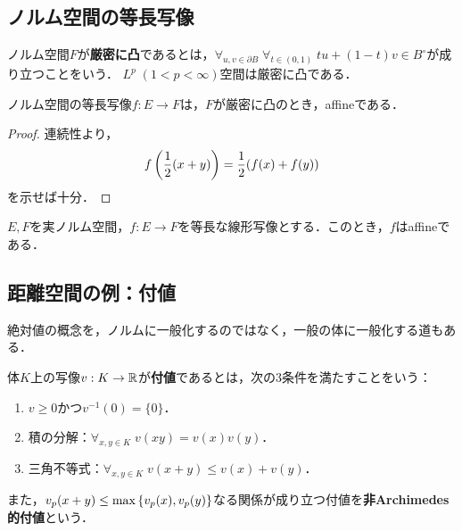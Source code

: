 \documentclass[uplatex,dvipdfmx]{jsreport}
\begin{document}
\subsection{ノルム空間の等長写像}

\begin{definition}
    ノルム空間$F$が\textbf{厳密に凸}であるとは，$\forall_{u,v\in\partial B}\;\forall_{t\in(0,1)}\;tu+(1-t)v\in B^\circ$が成り立つことをいう．
    $L^p\;(1<p<\infty)$空間は厳密に凸である．
\end{definition}

\begin{theorem}
    ノルム空間の等長写像$f:E\to F$は，$F$が厳密に凸のとき，affineである．
\end{theorem}
\begin{proof}
    連続性より，
    \[f\left(\frac{1}{2}(x+y)\right)=\frac{1}{2}(f(x)+f(y))\]
    を示せば十分．
\end{proof}

\begin{theorem}
    $E,F$を実ノルム空間，$f:E\to F$を等長な線形写像とする．このとき，$f$はaffineである．
\end{theorem}

\subsection{距離空間の例：付値}


\begin{tcolorbox}[colframe=ForestGreen, colback=ForestGreen!10!white,breakable,colbacktitle=ForestGreen!40!white,coltitle=black,fonttitle=\bfseries\sffamily,
    title=]
        絶対値の概念を，ノルムに一般化するのではなく，一般の体に一般化する道もある．
\end{tcolorbox}

\begin{definition}[valuation]
    体$K$上の写像$v:K\to\mathbb{R}$が\textbf{付値}であるとは，次の3条件を満たすことをいう：
    \begin{enumerate}
        \item $v\ge0$かつ$v^{-1}(0)=\{0\}$．
        \item 積の分解：$\forall_{x,y\in K}\;v(xy)=v(x)v(y)$．
        \item 三角不等式：$\forall_{x,y\in K}\;v(x+y)\le v(x)+v(y)$．
    \end{enumerate}
    また，$v_p(x+y)\le\max\left\{v_p(x),v_p(y)\right\}$なる関係が成り立つ付値を\textbf{非Archimedes的付値}という．
\end{definition}
\end{document}
